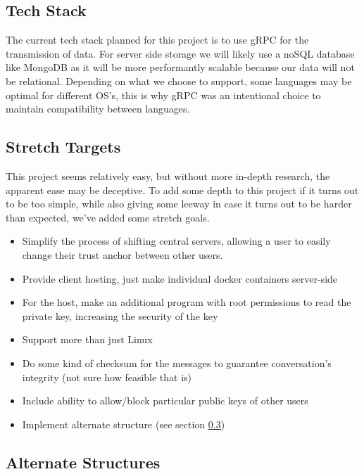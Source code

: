 \documentclass[titlepage]{article}
\begin{document}
    \subsection{Tech Stack}

      The current tech stack planned for this project is to use gRPC for the transmission of data.
      For server side storage we will likely use a noSQL database like MongoDB as it will be more performantly scalable because our data will not be relational.
      Depending on what we choose to support, some languages may be optimal for different OS's, this is why gRPC was an intentional choice to maintain compatibility between languages.

      \subsection{Stretch Targets}

      This project seems relatively easy, but without more in-depth research, the apparent ease may be deceptive.
      To add some depth to this project if it turns out to be too simple, while also giving some leeway in case it turns out to be harder than expected, we've added some stretch goals.
      \begin{itemize}
          \item Simplify the process of shifting central servers, allowing a user to easily change their trust anchor between other users.
          \item Provide client hosting, just make individual docker containers server-side
          \item For the host, make an additional program with root permissions to read the private key, increasing the security of the key
          \item Support more than just Linux
          \item Do some kind of checksum for the messages to guarantee conversation's integrity (not sure how feasible that is)
          \item Include ability to allow/block particular public keys of other users
          \item Implement alternate structure (see section \ref{AltStruct})
      \end{itemize}

      \subsection{Alternate Structures} \label{AltStruct}
      
\end{document}
